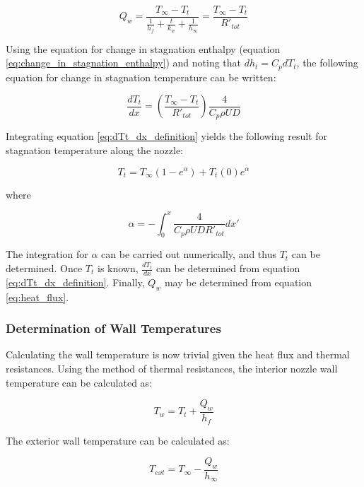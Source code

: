 \documentclass{article}
\begin{document}
\begin{equation}
\label{eq:heat_flux}
Q_w = \frac{T_{\infty} - T_t}{\frac{1}{h_f} + \frac{t}{k_w} + \frac{1}{h_{\infty}}} = \frac{T_{\infty} - T_t}{R'_{tot}}
\end{equation}

Using the equation for change in stagnation enthalpy (equation \ref{eq:change_in_stagnation_enthalpy}) and noting that $dh_t = C_p dT_t$, the following equation for change in stagnation temperature can be written:

\begin{equation}
\label{eq:dTt_dx_definition}
\frac{dT_t}{dx} = \left( \frac{T_{\infty} - T_t}{R'_{tot}} \right) \frac{4}{C_p \rho U D}
\end{equation}

Integrating equation \ref{eq:dTt_dx_definition} yields the following result for stagnation temperature along the nozzle:

\begin{equation}
T_t = T_{\infty} (1 - e^{\alpha}) + T_t(0) e^{\alpha}
\end{equation}

where

\begin{equation*}
\alpha = - \int_0^x \frac{4}{C_p \rho U D R'_{tot}} dx'
\end{equation*}

The integration for $\alpha$ can be carried out numerically, and thus $T_t$ can be determined. Once $T_t$ is known, $\frac{dT_t}{dx}$ can be determined from equation \ref{eq:dTt_dx_definition}. Finally, $Q_w$ may be determined from equation \ref{eq:heat_flux}. 

\subsubsection{Determination of Wall Temperatures}

Calculating the wall temperature is now trivial given the heat flux and thermal resistances. Using the method of thermal resistances, the interior nozzle wall temperature can be calculated as:

\begin{equation}
T_w = T_t + \frac{Q_w}{h_f}
\end{equation}

The exterior wall temperature can be calculated as:

\begin{equation}
T_{ext} = T_{\infty} - \frac{Q_w}{h_{\infty}}
\end{equation}
\end{document}
